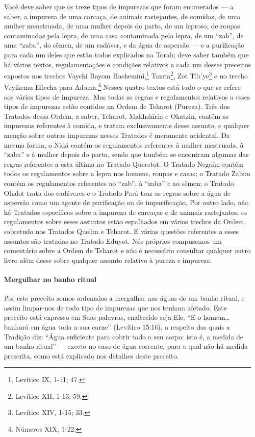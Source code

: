Você deve saber que os treze tipos de impurezas que foram enumerados
--- a saber, a impureza de uma carcaça, de animais rastejantes, de
comidas, de uma mulher menstruada, de uma mulher depois do parto, de um
leproso, de roupas contaminadas pela lepra, de uma casa contaminada
pela lepra, de um ``zab'', de uma ``zaba'', do sêmen, de um cadáver, e
da água de aspersão --- e a purificação para cada um deles que estão
todos explicados na Torah; deve saber também que há vários textos, regulamentações e condições relativos a cada um desses preceitos expostos nos trechos Vayehi Bayom
Hashemini,\footnote{Levítico IX, 1-11; 47.} Tazria\footnote{Levítico XII, 1-13; 59.}, Zot
Tih'ye\footnote{Levítico XIV, 1-15; 33.} e no trecho Veyikemu Eilecha para
Adoma.\footnote{Números XIX, 1-22.}
Nesses quatro textos está tudo o que se refere aos vários tipos de
impureza. Mas todas as regras e regulamentos relativos a esses tipos de
impurezas estão contidos na Ordem de Teharot (Pureza). Três dos
Tratados dessa Ordem, a saber, Teharot, Makhshirin e Okatzin, contêm as
impurezas referentes à comida, e tratam exclusivamente desse assunto, e
qualquer menção sobre outras impurezas nesses Tratados é meramente
acidental. Da mesma forma, o Nidá contém os regulamentos referentes à
mulher mestruada, à ``zaba'' e à mulher depois do parto, sendo que
também se encontram algumas das regras referentes a esta última no
Tratado Queretot. O Tratado Negaim contém todos os regulamentos sobre a
lepra nos homens, roupas e casas; o Tratado Zabim contém os
regulamentos referentes ao ``zab'', à ``zaba'' e ao sêmen; o Tratado
Ohalot trata dos cadáveres e o Tratado Pará traz as regras sobre a água
de aspersão como um agente de purificação ou de impurificação. Por outro
lado, não há Tratados específicos sobre a impureza de carcaças e de
animais rastejantes; os regulamentos sobre esses assuntos estão
espalhados em vários trechos da Ordem, sobretudo nos Tratados Quelim e
Teharot. E várias questões referentes a esses assuntos são tratadas no
Tratado Eduyot. Nós próprios compusemos um comentário sobre a Ordem de
Teharot e não é necessário consultar qualquer outro livro além desse
sobre qualquer assunto relativo à pureza e impureza.

\paragraph{Mergulhar no banho ritual}

Por este preceito somos ordenados a mergulhar nas águas de um banho
ritual, e assim limpar-nos de todo tipo de impurezas que nos tenham
afetado. Este preceito está expresso em Suas palavras, enaltecido seja
Ele, ``E o homem\ldots{} banhará em água toda a sua carne'' (Levítico
15:16), a respeito das quais a Tradição diz: ``Água suficiente para
cobrir todo o seu corpo: isto é, a medida de um banho ritual'' ---
exceto no caso de água corrente, para a qual não há medida prescrita,
como está explicado nos detalhes deste preceito.

